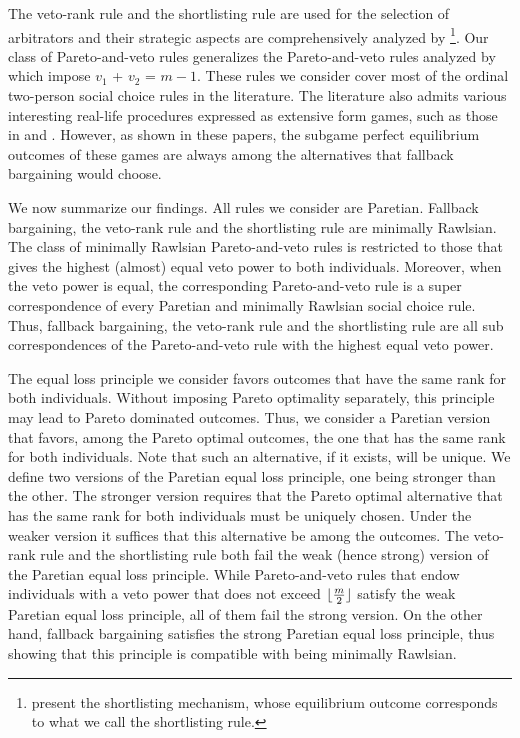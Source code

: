 \documentclass[version=3.21, pagesize, twoside=off, bibliography=totoc, DIV=calc, fontsize=12pt, a4paper]{scrartcl}
\begin{document}
The veto-rank rule and the shortlisting rule are used for the selection of arbitrators and their strategic aspects are comprehensively analyzed by \citet{Clippel}%
\footnote{ present the shortlisting mechanism, whose equilibrium outcome corresponds to what we call the shortlisting rule.}. Our class of Pareto-and-veto rules generalizes the Pareto-and-veto rules analyzed by \citet{laslier2021solution} which impose $v_1$ + $v_2$ = $m-1$. These rules we consider cover most of the ordinal two-person social choice rules in the literature. The literature also admits various interesting real-life procedures expressed as extensive form games, such as those in \citet{anbarci1993noncooperative, anbarci2006finite} and \citet{barbera2022compromising}. However, as shown in these papers, the subgame perfect equilibrium outcomes of these games are always among the alternatives that fallback bargaining would choose. 

We now summarize our findings. All rules we consider are Paretian. Fallback bargaining, the veto-rank rule and the shortlisting rule are minimally Rawlsian. The class of minimally Rawlsian Pareto-and-veto rules is restricted to those that gives the highest (almost) equal veto power to both individuals. Moreover, when the veto power is equal, the corresponding Pareto-and-veto rule is a super correspondence of every Paretian and minimally Rawlsian social choice rule. Thus, fallback bargaining, the veto-rank rule and the shortlisting rule are all sub correspondences of the Pareto-and-veto rule with the highest equal veto power.

The equal loss principle we consider favors outcomes that have the same rank for both individuals. Without imposing Pareto optimality separately, this principle may lead to Pareto dominated outcomes. Thus, we consider a Paretian version that favors, among the Pareto optimal outcomes, the one that has the same rank for both individuals. Note that such an alternative, if it exists, will be unique. We define two versions of the Paretian equal loss principle, one being stronger than the other. The stronger version requires that the Pareto optimal alternative that has the same rank for both individuals must be uniquely chosen. Under the weaker version it suffices that this alternative be among the outcomes. The veto-rank rule and the shortlisting rule both fail the weak (hence strong) version of the Paretian equal loss principle. While Pareto-and-veto rules that endow individuals with a veto power that does not exceed $\lfloor\frac{m}{2}\rfloor$ satisfy the weak Paretian equal loss principle, all of them fail the strong version. On the other hand, fallback bargaining satisfies the strong Paretian equal loss principle, thus showing that this principle is compatible with being minimally Rawlsian.
 
\end{document}
